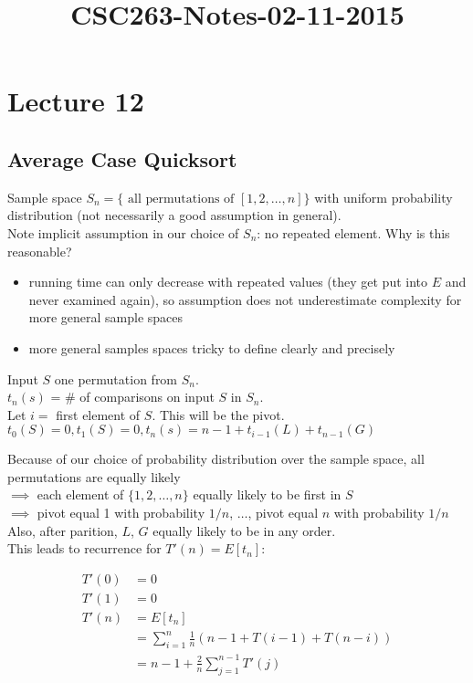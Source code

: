 



\title{CSC263-Notes-02-11-2015}



\section*{Lecture 12}

\subsection*{Average Case Quicksort}

\noindent Sample space $S_n = \{ \textrm{ all permutations of }[1,2,\ldots,n]\}$ with uniform probability distribution (not necessarily a good assumption in general). \\
Note implicit assumption in our choice of $S_n$: no repeated element. Why is this reasonable?
\begin{itemize}
	\item running time can only decrease with repeated values (they get put into $E$ and never examined again), so assumption does not underestimate complexity for more general sample spaces
	\item more general samples spaces tricky to define clearly and precisely
\end{itemize}
Input $S$ one permutation from $S_n$. \\
$t_n(s)$ = \# of comparisons on input $S$ in $S_n$. \\
Let $i = $ first element of $S$. This will be the pivot. \\
$t_0(S) = 0, t_1(S) = 0, t_n(s) = n-1 + t_{i-1}(L) + t_{n-1}(G)$ 

\noindent Because of our choice of probability distribution over the sample space, all permutations are equally likely \\
\indent $\implies$ each element of $\{1,2,\ldots,n\}$ equally likely to be first in $S$ \\
\indent $\implies$ pivot equal 1 with probability $1/n$, $\ldots$, pivot equal $n$ with probability $1/n$ \\
Also, after parition, $L$, $G$ equally likely to be in any order. \\

\noindent This leads to recurrence for $T'(n) = E[t_n]$:

\begin{equation*}
\begin{split}
T'(0) & = 0 \\
T'(1) & = 0 \\
T'(n) & = E[t_n] \\
& = \sum_{i=1}^n \frac{1}{n} (n-1 + T(i-1) + T(n-i)) \\
& = n-1 + \frac{2}{n} \sum_{j=1}^{n-1} T'(j) 
\end{split}
\end{equation*}


